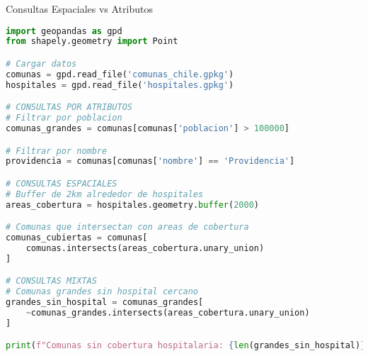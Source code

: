 \documentclass[10pt]{beamer}
\begin{document}
\begin{frame}[fragile]{Consultas Espaciales vs Atributos}
    \begin{lstlisting}[language=Python, caption=Tipos de consultas]
import geopandas as gpd
from shapely.geometry import Point

# Cargar datos
comunas = gpd.read_file('comunas_chile.gpkg')
hospitales = gpd.read_file('hospitales.gpkg')

# CONSULTAS POR ATRIBUTOS
# Filtrar por poblacion
comunas_grandes = comunas[comunas['poblacion'] > 100000]

# Filtrar por nombre
providencia = comunas[comunas['nombre'] == 'Providencia']

# CONSULTAS ESPACIALES
# Buffer de 2km alrededor de hospitales
areas_cobertura = hospitales.geometry.buffer(2000)

# Comunas que intersectan con areas de cobertura
comunas_cubiertas = comunas[
    comunas.intersects(areas_cobertura.unary_union)
]

# CONSULTAS MIXTAS
# Comunas grandes sin hospital cercano
grandes_sin_hospital = comunas_grandes[
    ~comunas_grandes.intersects(areas_cobertura.unary_union)
]

print(f"Comunas sin cobertura hospitalaria: {len(grandes_sin_hospital)}")
    \end{lstlisting}
\end{frame}
\end{document}
